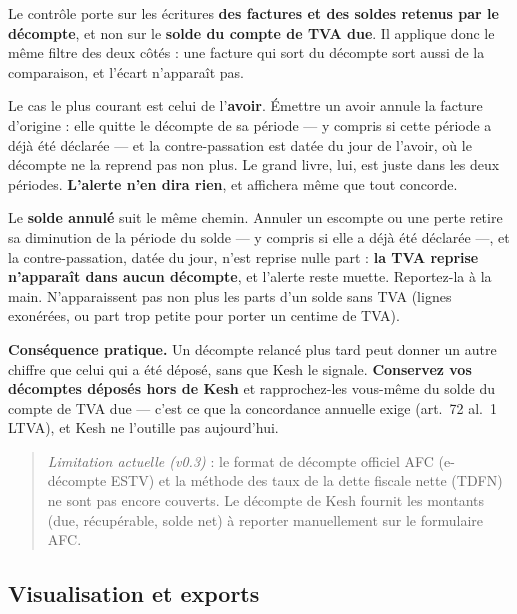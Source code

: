 \documentclass[a4paper,11pt,oneside]{article}
\begin{document}
\begin{keshwarning}[title=\faExclamationTriangle\ Cette alerte ne rapproche pas le décompte du grand livre]
Le contrôle porte sur les écritures \textbf{des factures et des soldes retenus par le décompte}, et non sur
le \textbf{solde du compte de TVA due}. Il applique donc le même filtre des deux côtés : une
facture qui sort du décompte sort aussi de la comparaison, et l'écart n'apparaît pas.

\medskip
\noindent Le cas le plus courant est celui de l'\textbf{avoir}. Émettre un avoir annule la
facture d'origine : elle quitte le décompte de sa période --- y compris si cette période a
déjà été déclarée --- et la contre-passation est datée du jour de l'avoir, où le décompte ne
la reprend pas non plus. Le grand livre, lui, est juste dans les deux périodes.
\textbf{L'alerte n'en dira rien}, et affichera même que tout concorde.

\medskip
\noindent Le \textbf{solde annulé} suit le même chemin. Annuler un escompte ou une perte retire
sa diminution de la période du solde --- y compris si elle a déjà été déclarée ---, et la
contre-passation, datée du jour, n'est reprise nulle part : \textbf{la TVA reprise n'apparaît
dans aucun décompte}, et l'alerte reste muette. Reportez-la à la main. N'apparaissent pas non
plus les parts d'un solde sans TVA (lignes exonérées, ou part trop petite pour porter un
centime de TVA).

\medskip
\noindent \textbf{Conséquence pratique.} Un décompte relancé plus tard peut donner un autre
chiffre que celui qui a été déposé, sans que Kesh le signale. \textbf{Conservez vos décomptes
déposés hors de Kesh} et rapprochez-les vous-même du solde du compte de TVA due --- c'est ce
que la concordance annuelle exige (art.~72 al.~1 LTVA), et Kesh ne l'outille pas aujourd'hui.
\end{keshwarning}

\begin{quote}
\small \emph{Limitation actuelle (v0.3)} : le format de décompte officiel AFC (e-décompte ESTV) et la méthode des taux de la dette fiscale nette (TDFN) ne sont pas encore couverts. Le décompte de Kesh fournit les montants (due, récupérable, solde net) à reporter manuellement sur le formulaire AFC.
\end{quote}

\subsection{Visualisation et exports}\label{sec:rapports-exports}
\end{document}
